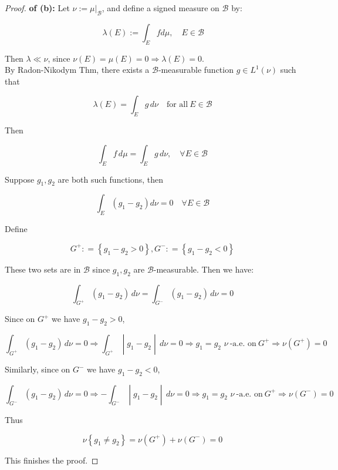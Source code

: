 \documentclass{qlnotes-export}
\begin{document}
\begin{proof}

\textbf{of (b):} Let \(\nu := \mu|_{\mathcal{B}}\), and define a signed measure on \(\mathcal{B}\) by:

\[\,\lambda(E) := \int_{E}fd\mu,\quad E \in \mathcal{B}\]

Then \(\lambda \ll \nu\), since \(\nu(E) = \mu(E) = 0\Longrightarrow\lambda(E) = 0\).\\
By Radon-Nikodym Thm, there exists a \(\mathcal{B}\)-measurable function \(g \in L^{1}(\nu)\) such that

\[\lambda(E) = \int_{E}g\, d\nu\quad\text{for all}\ E \in \mathcal{B}\]

Then

\[\int_{E}f\, d\mu = \int_{E}g\, d\nu,\quad\forall E \in \mathcal{B}\]

Suppose \(g_{1},g_{2}\) are both such functions, then

\[\int_{E}\left( {g_{1} - g_{2}} \right)d\nu = 0\quad\forall E \in \mathcal{B}\]

Define

\[G^{+}: = \left\{ {g_{1} - g_{2} > 0} \right\},G^{-}: = \left\{ {g_{1} - g_{2} < 0} \right\}\]

These two sets are in \(\mathcal{B}\) since \(g_{1},g_{2}\) are \(\mathcal{B}\)-measurable. Then we have:

\[\int_{G^{+}}(g_{1} - g_{2})\, d\nu = \int_{G^{-}}(g_{1} - g_{2})\, d\nu = 0\]

Since on \(G^{+}\) we have \(g_{1} - g_{2} > 0\),

\[\left. \int_{G^{+}}(g_{1} - g_{2})\, d\nu = 0\Longrightarrow\int_{G^{+}} \middle| g_{1} - g_{2} \middle| \, d\nu = 0\Longrightarrow g_{1} = g_{2}\,\,\nu\ \text{-a.e. on}\ G^{+}\Longrightarrow\nu(G^{+}) = 0 \right.\]

Similarly, since on \(G^{-}\) we have \(g_{1} - g_{2} < 0\),

\[\left. \int_{G^{-}}(g_{1} - g_{2})\, d\nu = 0\Longrightarrow - \int_{G^{-}} \middle| g_{1} - g_{2} \middle| \, d\nu = 0\Longrightarrow g_{1} = g_{2}\,\,\nu\ \text{-a.e. on}\ G^{+}\Longrightarrow\nu(G^{-}) = 0 \right.\]

Thus

\[\nu\left\{ {g_{1} \neq g_{2}} \right\} = \nu(G^{+}) + \nu(G^{-}) = 0\]

This finishes the proof.

\end{proof}
\end{document}
